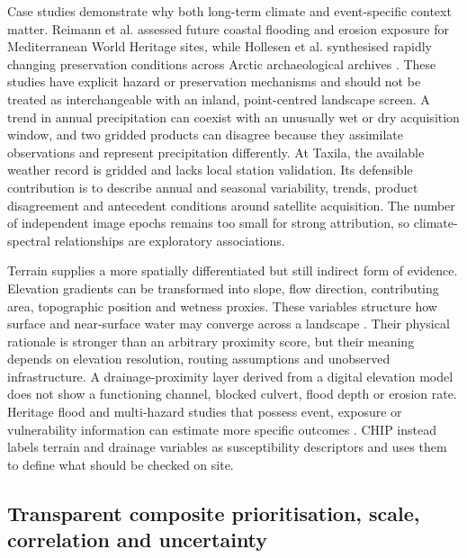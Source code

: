 Case studies demonstrate why both long-term climate and event-specific context matter. Reimann et al. assessed future coastal flooding and erosion exposure for Mediterranean World Heritage sites, while Hollesen et al. synthesised rapidly changing preservation conditions across Arctic archaeological archives \citep{reimann2018mediterranean,hollesen2018arctic}. These studies have explicit hazard or preservation mechanisms and should not be treated as interchangeable with an inland, point-centred landscape screen. A trend in annual precipitation can coexist with an unusually wet or dry acquisition window, and two gridded products can disagree because they assimilate observations and represent precipitation differently. At Taxila, the available weather record is gridded and lacks local station validation. Its defensible contribution is to describe annual and seasonal variability, trends, product disagreement and antecedent conditions around satellite acquisition. The number of independent image epochs remains too small for strong attribution, so climate-spectral relationships are exploratory associations.

Terrain supplies a more spatially differentiated but still indirect form of evidence. Elevation gradients can be transformed into slope, flow direction, contributing area, topographic position and wetness proxies. These variables structure how surface and near-surface water may converge across a landscape \citep{beven1979topmodel,moore1991terrain,quinn1991flow,tarboton1997flow}. Their physical rationale is stronger than an arbitrary proximity score, but their meaning depends on elevation resolution, routing assumptions and unobserved infrastructure. A drainage-proximity layer derived from a digital elevation model does not show a functioning channel, blocked culvert, flood depth or erosion rate. Heritage flood and multi-hazard studies that possess event, exposure or vulnerability information can estimate more specific outcomes \citep{liu2019angkor,guerriero2022derwent,arrighi2023flood}. CHIP instead labels terrain and drainage variables as susceptibility descriptors and uses them to define what should be checked on site.

\subsection{Transparent composite prioritisation, scale, correlation and uncertainty}


